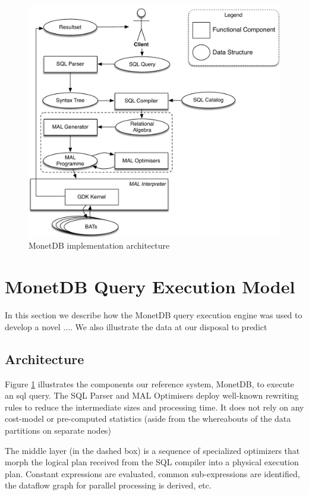 \begin{figure}[!htb]
  \centering
  \includegraphics[width=0.9\columnwidth]{figs/MDB_architecture.pdf}
  \caption{MonetDB implementation architecture}
  \label{fig:mdbarch}
\end{figure}

\section{MonetDB Query Execution Model}
In this section we describe how the MonetDB query execution engine was used
 to develop a novel .... We also illustrate the data at our disposal to predict

\subsection{Architecture}
Figure \ref{fig:mdbarch} illustrates the components our reference system, MonetDB,
to execute an sql query. The SQL Parser and MAL Optimisers deploy well-known
rewriting rules to reduce the intermediate sizes and processing time.
It does not rely on any cost-model or pre-computed statistics
(aside from the whereabouts of the data partitions on separate nodes)

The middle layer (in the dashed box) is a sequence of specialized optimizers that morph the logical
plan received from the SQL compiler into a physical execution plan.
Constant expressions are evaluated, common sub-expressions are identified,
the dataflow graph for parallel processing is derived, etc.


